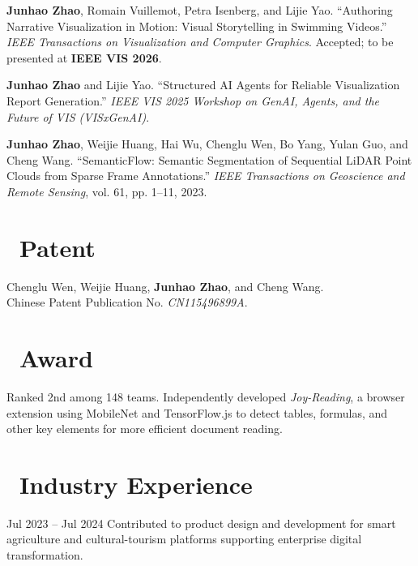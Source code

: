 \documentclass{resume}
\begin{document}
\begin{enumerate}[label={[\arabic*]}]
  \item \textbf{Junhao Zhao}, Romain Vuillemot, Petra Isenberg, and Lijie Yao.
  ``Authoring Narrative Visualization in Motion: Visual Storytelling in
  Swimming Videos.'' \textit{IEEE Transactions on Visualization and Computer
  Graphics}. Accepted; to be presented at \textbf{IEEE VIS 2026}.

  \item \textbf{Junhao Zhao} and Lijie Yao.
  ``Structured AI Agents for Reliable Visualization Report Generation.''
  \textit{IEEE VIS 2025 Workshop on GenAI, Agents, and the Future of VIS
  (VISxGenAI)}.

  \item \textbf{Junhao Zhao}, Weijie Huang, Hai Wu, Chenglu Wen, Bo Yang,
  Yulan Guo, and Cheng Wang.
  ``SemanticFlow: Semantic Segmentation of Sequential LiDAR Point Clouds from
  Sparse Frame Annotations.'' \textit{IEEE Transactions on Geoscience and
  Remote Sensing}, vol. 61, pp. 1--11, 2023.
\end{enumerate}

\section{\faBalanceScale\ Patent}

Chenglu Wen, Weijie Huang, \textbf{Junhao Zhao}, and Cheng Wang.
\\Chinese Patent Publication No. \textit{CN115496899A}.

\section{\faTrophy\ Award}

Ranked 2nd among 148 teams. Independently developed \textit{Joy-Reading}, a
browser extension using MobileNet and TensorFlow.js to detect tables,
formulas, and other key elements for more efficient document reading.

\section{\faBriefcase\ Industry Experience}

{Jul 2023 -- Jul 2024}
Contributed to product design and development for smart agriculture and
cultural-tourism platforms supporting enterprise digital transformation.
\end{document}
